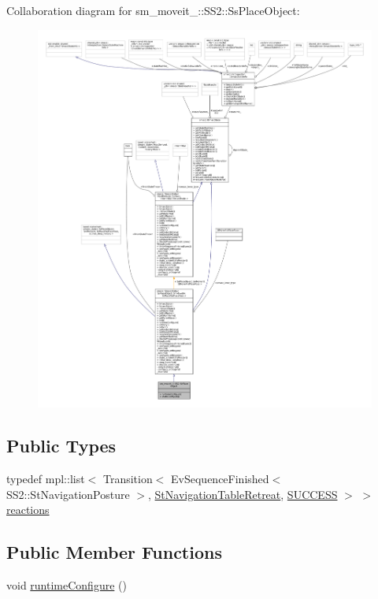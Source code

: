Collaboration diagram for sm\+\_\+moveit\+\_\+:\+:S\+S2\+:\+:Ss\+Place\+Object\+:
\nopagebreak
\begin{figure}[H]
\begin{center}
\leavevmode
\includegraphics[width=350pt]{structsm__moveit__4_1_1SS2_1_1SsPlaceObject__coll__graph}
\end{center}
\end{figure}
\subsection*{Public Types}
\begin{DoxyCompactItemize}
\item 
typedef mpl\+::list$<$ Transition$<$ Ev\+Sequence\+Finished$<$ S\+S2\+::\+St\+Navigation\+Posture $>$, \hyperlink{structsm__moveit__4_1_1StNavigationTableRetreat}{St\+Navigation\+Table\+Retreat}, \hyperlink{classSUCCESS}{S\+U\+C\+C\+E\+SS} $>$ $>$ \hyperlink{structsm__moveit__4_1_1SS2_1_1SsPlaceObject_a51693005763762aec9f908f0a624ee87}{reactions}
\end{DoxyCompactItemize}
\subsection*{Public Member Functions}
\begin{DoxyCompactItemize}
\item 
void \hyperlink{structsm__moveit__4_1_1SS2_1_1SsPlaceObject_a930b4228defad612e6fe391e78345819}{runtime\+Configure} ()
\end{DoxyCompactItemize}
